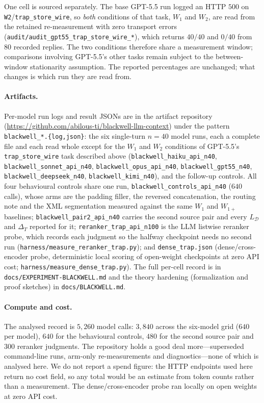 \documentclass[11pt]{article}
\theoremstyle{plain}
\theoremstyle{definition}
\theoremstyle{remark}
\newcommand{\Dcal}{\mathcal{D}}
\begin{document}
One cell is sourced separately. The base GPT-5.5 run logged an HTTP $500$ on
\texttt{W2}/\texttt{trap\_store\_wire}, so \emph{both} conditions of that task, $W_1$ and $W_2$,
are read from the retained re-measurement with zero transport errors
(\texttt{audit/audit\_gpt55\_trap\_store\_wire\_*}), which returns $40/40$ and $0/40$ from $80$
recorded replies. The two conditions therefore share a measurement window; comparisons involving
GPT-5.5's other tasks remain subject to the between-window stationarity assumption. The reported
percentages are unchanged; what changes is which run they are read from.

\begin{sloppypar}
\paragraph{Artifacts.} Per-model run logs and result JSONs are in the artifact repository
(\url{https://github.com/abilous-ti/blackwell-llm-context}) under the pattern
\texttt{blackwell\_*.\{log,json\}}: the six single-turn $n=40$ model runs, each a complete file and
each read whole except for the $W_1$ and $W_2$ conditions of GPT-5.5's
\texttt{trap\_store\_wire} task described above
(\texttt{blackwell\_haiku\_api\_n40},
\texttt{blackwell\_sonnet\_api\_n40}, \texttt{blackwell\_opus\_api\_n40},
\texttt{blackwell\_gpt55\_n40}, \texttt{blackwell\_deepseek\_n40}, \texttt{blackwell\_kimi\_n40}),
and the follow-up controls. All four behavioural controls share one run,
\texttt{blackwell\_controls\_api\_n40} ($640$ calls), whose arms are the padding filler, the
reversed concatenation, the routing note and the XML segmentation measured against the same
$W_1$ and $W_{1+}$ baselines; \texttt{blackwell\_pair2\_api\_n40} carries the second source pair
and every $L_{\Dcal}$ and $\Delta_T$ reported for it; \texttt{reranker\_trap\_api\_n100} is the
LLM listwise reranker probe, which records each judgment so the halfway checkpoint needs no
second run (\texttt{harness/measure\_reranker\_trap.py}); and \texttt{dense\_trap.json} (dense/cross-encoder
probe, deterministic local scoring of open-weight checkpoints at zero API cost;
\texttt{harness/measure\_dense\_trap.py}). The full per-cell record is in
\texttt{docs/EXPERIMENT-BLACKWELL.md} and the theory hardening (formalization and proof
sketches) in \texttt{docs/BLACKWELL.md}.
\end{sloppypar}

\paragraph{Compute and cost.} The analysed record is $5{,}260$ model calls: $3{,}840$ across the
six-model grid ($640$ per model), $640$ for the behavioural controls, $480$ for the second source
pair and $300$ reranker judgments. The repository holds a good deal more---superseded
command-line runs, arm-only re-measurements and diagnostics---none of which is analysed here. We do not report a spend figure: the HTTP endpoints used here return no
cost field, so any total would be an estimate from token counts rather than a measurement. The dense/cross-encoder probe ran locally
on open weights at zero API cost.




\end{document}
